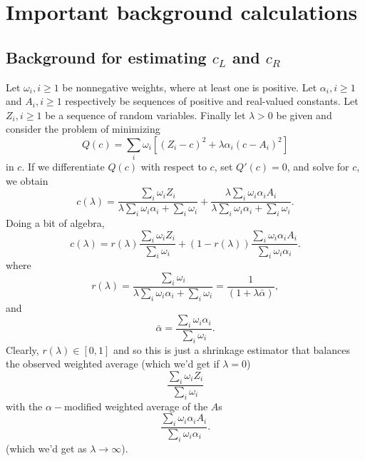\documentclass[12pt]{article}
\begin{document}

\section{Important background calculations}
\label{bkgrnd}
\subsection{Background for estimating $c_L$ and $c_R$}
\label{Est}
Let $\omega_i, i \geq 1$ be nonnegative weights, where at least one is positive. Let $\alpha_i, i \geq 1$ and $A_i, i \geq 1$ respectively be sequences of positive and real-valued constants. Let $Z_i, i \geq 1$ be a sequence of random variables. Finally let $\lambda > 0$ be given and consider the problem of minimizing
\[
Q(c) = {\textstyle \sum\nolimits}_i \omega_i \left[ (Z_{i}-c)^2 + \lambda \alpha_i (c-A_i)^2 \right]
\]
in $c$.  If we differentiate $Q(c)$ with respect to $c$, set $Q'(c) = 0$, and solve for $c$, we obtain
\[
c(\lambda) = \frac{\sum_i \omega_i Z_i}{\lambda \sum_i \omega_i \alpha_i + \sum_i \omega_i}
+  \frac{ \lambda \sum_i \omega_i \alpha_i A_i}{\lambda \sum_i \omega_i \alpha_i + \sum_i \omega_i}.
\]
Doing a bit of algebra,
\begin{equation}
\label{clambda}
c(\lambda) = r(\lambda) \frac{\sum_i \omega_i Z_i}{\sum_i \omega_i}
+  (1-r(\lambda)) \frac{ \sum_i \omega_i \alpha_i A_i}{ \sum_i \omega_i \alpha_i }.
\end{equation}
where
\begin{equation}
\label{rlambda}
r(\lambda) = \frac{\sum_i \omega_i}{\lambda \sum_i \omega_i \alpha_i + \sum_i \omega_i}  = 
\frac{1}{(1 + \lambda \bar{\alpha})},
\end{equation}
and
\begin{equation}
\label{baralpha}
 \bar{\alpha} = \frac{\sum_i \omega_i \alpha_i}{\sum_i \omega_i}.
\end{equation}
Clearly, $r(\lambda) \in [0,1]$ and so this is just a shrinkage estimator that balances the
observed weighted average (which we'd get if $\lambda = 0$) 
\[
 \frac{\sum_i \omega_i Z_i}{\sum_i \omega_i}
\]
with the $\alpha-$modified weighted average of the $A$s
\[
\frac{ \sum_i \omega_i \alpha_i A_i}{ \sum_i \omega_i \alpha_i }.
\]
(which we'd get as $\lambda \rightarrow \infty$).
\end{document}
